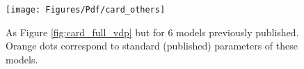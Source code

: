 \begin{figure}
\texttt{[image: Figures/Pdf/card\_others]}
\caption
{
As Figure \ref{fig:card_full_vdp} but for 6 models previously published. 
Orange dots correspond to standard (published) parameters of these models. 
}
\label{fig:card_others}
\end{figure}
